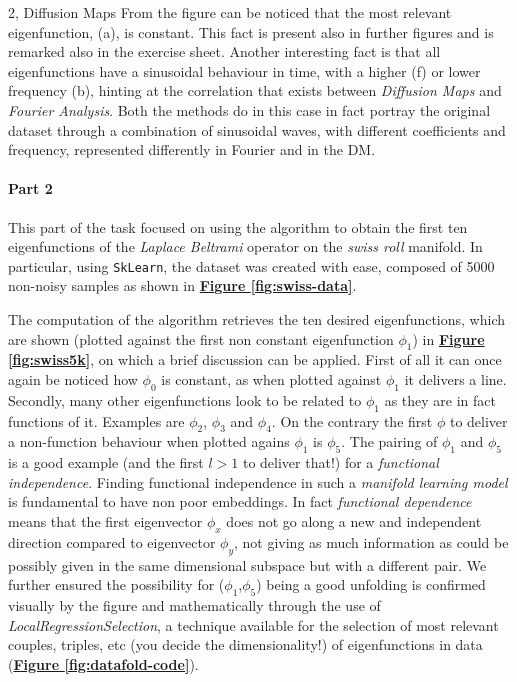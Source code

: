 \documentclass[10pt,a4paper]{article}
\begin{document}
\begin{task}{2, Diffusion Maps}
From the figure can be noticed that the most relevant eigenfunction, (a), is constant. This fact is present also in further figures and is remarked also in the exercise sheet. Another interesting fact is that all eigenfunctions have a sinusoidal behaviour in time, with a higher (f) or lower frequency (b), hinting at the correlation that exists between \textit{Diffusion Maps} and \textit{Fourier Analysis}. Both the methods do in this case in fact portray the original dataset through a combination of sinusoidal waves, with different coefficients and frequency, represented differently in Fourier and in the DM. 

\paragraph{Part 2}
This part of the task focused on using the algorithm to obtain the first ten eigenfunctions of the \textit{Laplace Beltrami} operator on the \textit{swiss roll} manifold. In particular, using \texttt{SkLearn}, the dataset was created with ease, composed of 5000 non-noisy samples as shown in \textbf{\hyperref[fig:swiss-data]{Figure \ref{fig:swiss-data}}}.

The computation of the algorithm retrieves the ten desired eigenfunctions, which are shown (plotted against the first non constant eigenfunction $\phi_1$) in \textbf{\hyperref[fig:swiss5k]{Figure \ref{fig:swiss5k}}}, on which a brief discussion can be applied. First of all it can once again be noticed how $\phi_0$ is constant, as when plotted against $\phi_1$ it delivers a line. Secondly, many other eigenfunctions look to be related to $\phi_1$ as they are in fact functions of it. Examples are $\phi_2$, $\phi_3$ and $\phi_4$. On the contrary the first $\phi$ to deliver a non-function behaviour when plotted agains $\phi_1$ is $\phi_5$. The pairing of $\phi_1$ and $\phi_5$ is a good example (and the first $l>1$ to deliver that!) for a \textit{functional independence}. Finding functional independence in such a \textit{manifold learning model} is fundamental to have non poor embeddings. In fact \textit{functional dependence} means that the first eigenvector $\phi_x$ does not go along a new and independent direction compared to eigenvector $\phi_y$, not giving as much information as could be possibly given in the same dimensional subspace but with a different pair. We further ensured the possibility for ($\phi_1$,$\phi_5$) being a good unfolding is confirmed visually by the figure and mathematically through the use of \textit{LocalRegressionSelection}, a technique available for the selection of most relevant couples, triples, etc (you decide the dimensionality!) of eigenfunctions in data (\textbf{\hyperref[fig:datafold-code]{Figure \ref{fig:datafold-code}}}).


\end{task}
\end{document}
